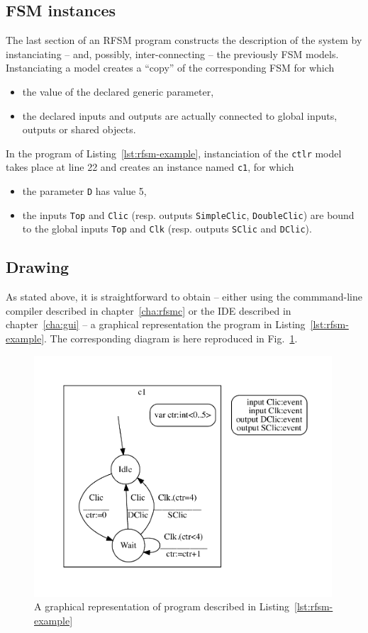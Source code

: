 \subsection*{FSM instances}
\label{sec:fsm-instances}

The last section of an RFSM program constructs the description of the system by instanciating
-- and, possibly, inter-connecting -- the previously FSM models.
Instanciating a model creates a ``copy'' of the corresponding FSM for which
\begin{itemize}
\item the value of the declared generic parameter,
\item the declared inputs and outputs are actually connected to global inputs, outputs or shared
  objects.
\end{itemize}

In the program of Listing~\ref{lst:rfsm-example}, instanciation of the \verb|ctlr| model takes place
at line 22 and creates an instance named \verb|c1|, for which
\begin{itemize}
\item the parameter \verb|D| has value 5,
\item the inputs \verb|Top| and \verb|Clic| (resp. outputs \verb|SimpleClic|, \verb|DoubleClic|) are bound to
  the global inputs \verb|Top| and \verb|Clk|  (resp. outputs  \verb|SClic| and \verb|DClic|).
\end{itemize}

\subsection*{Drawing}
\label{sec:drawing-1}

As stated above, it is straightforward to obtain -- either using the commmand-line compiler
described in chapter~\ref{cha:rfsmc} or the IDE described in chapter~\ref{cha:gui} -- a graphical
representation the program in Listing~\ref{lst:rfsm-example}. The corresponding diagram is here
reproduced in Fig.~\ref{fig:rfsm-example-top}.

\begin{figure}[h]
   \includegraphics[height=9cm]{figs/ctlsouris-top}
   \centering
  \caption{A graphical representation of program described in Listing~\ref{lst:rfsm-example}}
  \label{fig:rfsm-example-top}
\end{figure}

